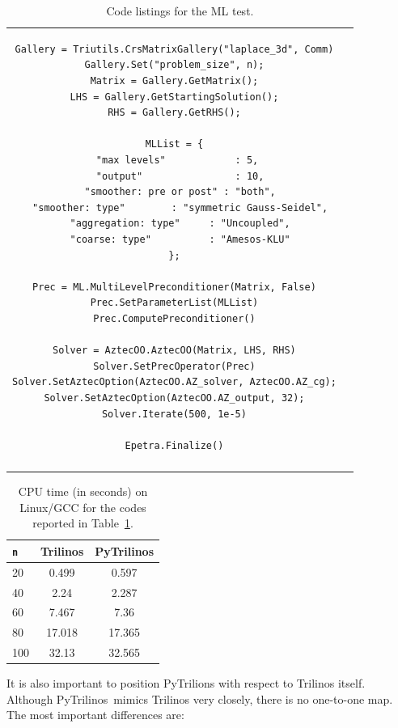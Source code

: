 \documentclass[10pt,relax]{SANDreport}
\newcommand{\PyTrilinos}{{PyTrilinos}}
\begin{document}
\begin{table}
\begin{tabular}{| c  | c|}
\begin{minipage}{10.5cm}
\begin{verbatim}
Gallery = Triutils.CrsMatrixGallery("laplace_3d", Comm)
Gallery.Set("problem_size", n);
Matrix = Gallery.GetMatrix();
LHS = Gallery.GetStartingSolution();
RHS = Gallery.GetRHS();

MLList = {
  "max levels"            : 5, 
  "output"                : 10,
  "smoother: pre or post" : "both",
  "smoother: type"        : "symmetric Gauss-Seidel",
  "aggregation: type"     : "Uncoupled",
  "coarse: type"          : "Amesos-KLU"
};

Prec = ML.MultiLevelPreconditioner(Matrix, False)
Prec.SetParameterList(MLList)
Prec.ComputePreconditioner()

Solver = AztecOO.AztecOO(Matrix, LHS, RHS)
Solver.SetPrecOperator(Prec)
Solver.SetAztecOption(AztecOO.AZ_solver, AztecOO.AZ_cg);
Solver.SetAztecOption(AztecOO.AZ_output, 32);
Solver.Iterate(500, 1e-5)

Epetra.Finalize()
\end{verbatim}
\end{minipage}
\\
&  \\
\hline
\end{tabular}
\caption{Code listings for the ML test.}
\label{tab:code_ml}
\end{table}


\begin{table}
\begin{center}
\begin{tabular}{| l | c | c |}
\hline
\tt n & Trilinos & PyTrilinos \\
\hline
20  & 0.499  & 0.597 \\
40  & 2.24   & 2.287 \\
60  & 7.467  & 7.36 \\
80  & 17.018 & 17.365 \\
100 & 32.13  & 32.565 \\
\hline
\end{tabular}
\caption{CPU time (in seconds) on Linux/GCC for the codes reported in
Table~\ref{tab:code_ml}.}
\label{tab:time_ml}
\end{center}
\end{table}

It is also important to position PyTrilions with respect to Trilinos
itself.  Although \PyTrilinos\ mimics Trilinos very closely, there is
no one-to-one map. The most important differences are:
\end{document}
